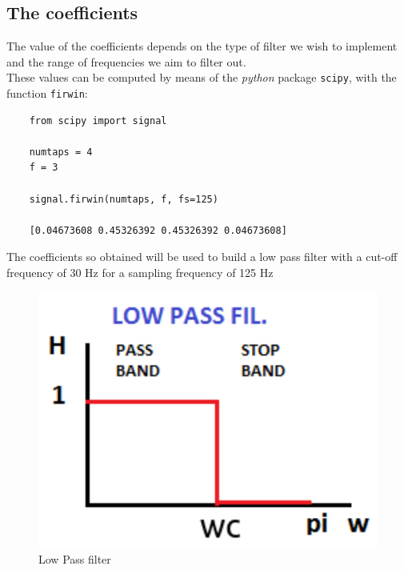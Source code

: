 \documentclass[11pt,a4paper,twocolumn]{IEEEtran}
\begin{document}
	\subsection*{The coefficients}
	The value of the coefficients depends on the type of filter we wish to implement and the range of frequencies we aim to filter out.\\
	These values can be computed by means of the \emph{python} package \texttt{scipy}, with the function \texttt{firwin}:
	\begin{lstlisting}
	from scipy import signal
	
	numtaps = 4
	f = 3
	
	signal.firwin(numtaps, f, fs=125)
	
	[0.04673608 0.45326392 0.45326392 0.04673608]
	\end{lstlisting}
	The coefficients so obtained will be used to build a low pass filter with a cut-off frequency of 30 Hz for a sampling frequency of 125 Hz
	\begin{figure}[h]
		\centering
		\includegraphics[width=0.7\linewidth]{img/lowpass}
		\caption{Low Pass filter}
	\end{figure}
\end{document}
